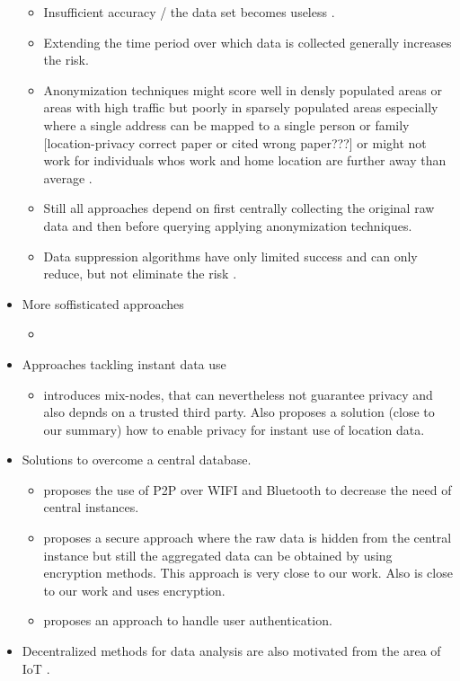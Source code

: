 \begin{itemize}
	\begin{itemize}
		\item Insufficient accuracy / the data set becomes useless \parencite{krumm, cellphone, k-anonymity-old, k-anonymity, k-anonymity-achieving}.
		\item Extending the time period over which data is collected generally increases the risk.
		\item Anonymization techniques might score well in densly populated areas or areas with high traffic but poorly in sparsely populated areas especially where a single address can be mapped to a single person or family \parencite{time-to-confusion, location-privacy, hoh2006enhancing} [location-privacy correct paper or cited wrong paper???] or might not work for individuals whos work and home location are further away than average \parencite{privacy-home-work-pairs}.
		\item Still all approaches depend on first centrally collecting the original raw data and then before querying \parencite{k-anonymity} applying anonymization techniques.
		\item Data suppression algorithms have only limited success and can only reduce, but not eliminate the risk \parencite{hoh2006enhancing}.
	\end{itemize}
	\item More soffisticated approaches
	\begin{itemize}
		\item \parencite{time-to-confusion}
	\end{itemize}
	\item Approaches tackling instant data use
	\begin{itemize}
		\item \parencite{location-privacy, mix-zones} introduces mix-nodes, that can nevertheless not guarantee privacy and also depnds on a trusted third party.
		Also \parencite{casper} proposes a solution (close to our summary) how to enable privacy for instant use of location data.
	\end{itemize}
	\item Solutions to overcome a central database.
	\begin{itemize}
		\item \parencite{p2p-android} proposes the use of P2P over WIFI and Bluetooth to decrease the need of central instances.
		\item \parencite{crowdsourcing} proposes a secure approach where the raw data is hidden from the central instance but still the aggregated data can be obtained by using encryption methods. This approach is very close to our work. Also \parencite{hoh2006enhancing} is close to our work and uses encryption.
		\item \parencite{hoh2006enhancing} proposes an approach to handle user authentication.
	\end{itemize}
	\item Decentralized methods for data analysis are also motivated from the area of IoT \parencite{iot}.
\end{itemize}

